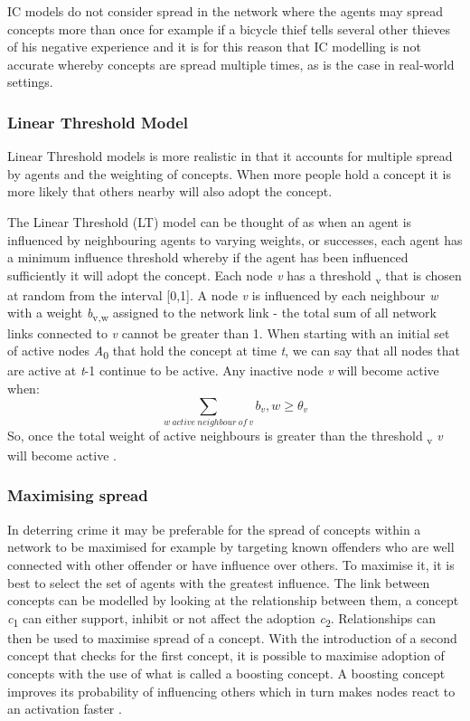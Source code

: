 \documentclass[11pt]{informatics-report}
\begin{document}
IC models do not consider spread in the network where the agents may spread concepts more than once for example if a bicycle thief tells several other thieves of his negative experience and it is for this reason that IC modelling is not accurate whereby concepts are spread multiple times, as is the case in real-world settings.

\subsubsection{Linear Threshold Model}
Linear Threshold models is more realistic in that it accounts for multiple spread by agents and the weighting of concepts. When more people hold a concept it is more likely that others nearby will also adopt the concept.

The Linear Threshold (LT) model can be thought of as when an agent is influenced by neighbouring agents to varying weights, or successes, each agent has a minimum influence threshold whereby if the agent has been influenced sufficiently it will adopt the concept. 
Each node \emph{v} has a threshold \texttheta\textsubscript{v} that is chosen at random from the interval [0,1]. A node \emph{v} is influenced by each neighbour \emph{w} with a weight \emph{b}\textsubscript{v,w} assigned to the network link - the total sum of all network links connected to \emph{v} cannot be greater than 1. When starting with an initial set of active nodes \emph{A}\textsubscript{0} that hold the concept at time \emph{t}, we can say that all nodes that are active at \emph{t}-1 continue to be active. Any inactive node \emph{v} will become active when: \[\sum_{w \: active \: neighbour \: of \: v} b_v,w 	\ge \theta_v \]
So, once the total weight of active neighbours is greater than the threshold \texttheta\textsubscript{v} \emph{v} will become active \cite{ic2}.

\subsubsection{Maximising spread}
In deterring crime it may be preferable for the spread of concepts within a network to be maximised for example by targeting known offenders who are well connected with other offender or have influence over others. To maximise it, it is best to select the set of agents with the greatest influence. The link between concepts can be modelled by looking at the relationship between them, a concept \emph{c}\textsubscript{1} can either support, inhibit or not affect the adoption \emph{c}\textsubscript{2}. Relationships can then be used to maximise spread of a concept. With the introduction of a second concept that checks for the first concept, it is possible to maximise adoption of concepts with the use of what is called a boosting concept. A boosting concept improves its probability of influencing others which in turn makes nodes react to an activation faster \cite{boost}.\par
\end{document}
